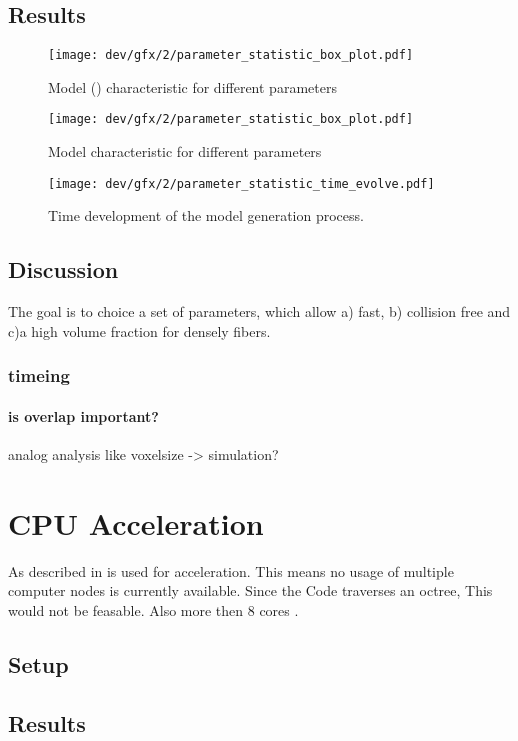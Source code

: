 \subsection{Results}
% 
% 
\begin{figure}[!t]
\centering
\texttt{[image: dev/gfx/2/parameter\_statistic\_box\_plot.pdf]}
\caption{Model (\fiberRadius) characteristic for different parameters}
\end{figure}
% 
\begin{figure}[!t]
\centering
\texttt{[image: dev/gfx/2/parameter\_statistic\_box\_plot.pdf]}
\caption{Model characteristic for different parameters}
\end{figure}

\begin{figure}[!t]
\centering
\texttt{[image: dev/gfx/2/parameter\_statistic\_time\_evolve.pdf]}
\caption[Time development of the model generation process.]{Time development of the model generation process.}
\end{figure}
% 
\subsection{Discussion}
% 
The goal is to choice a set of parameters, which allow a) fast, b) collision free and c)a high volume fraction for densely fibers. 
%  
\subsubsection{timeing}
% 
\paragraph{is overlap important?}
% 
analog analysis like voxelsize -> simulation?
% 
\section{CPU Acceleration}
% 
As described in \dummy \openmp is used for acceleration.
This means no usage of multiple computer nodes is currently available.
Since the Code traverses an octree, This would not be feasable.
Also more then 8 cores \dummy.
% 
\subsection{Setup}
% 
\subsection{Results}
% 
